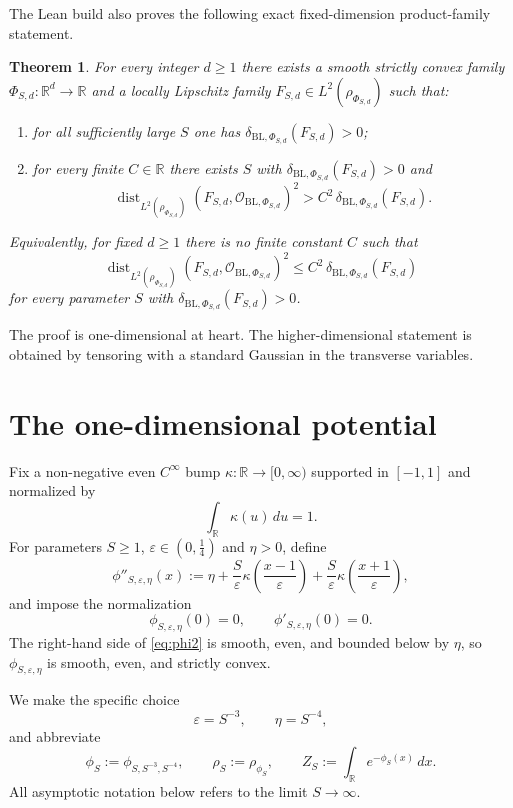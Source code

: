 \documentclass[11pt]{amsart}
\newtheorem{theorem}{Theorem}[section]
\theoremstyle{remark}
\DeclareMathOperator{\dist}{dist}
\newcommand{\R}{\mathbb R}
\newcommand{\cO}{\mathcal O}
\newcommand{\BL}{\mathrm{BL}}
\begin{document}
The Lean build also proves the following exact fixed-dimension product-family
statement.

\begin{theorem}\label{thm:main}
For every integer $d\ge 1$ there exists a smooth strictly convex family
$\Phi_{S,d}:\R^d\to\R$ and a locally Lipschitz family
$F_{S,d}\in L^2(\rho_{\Phi_{S,d}})$ such that:
\begin{enumerate}
\item for all sufficiently large $S$ one has
  $\delta_{\BL,\Phi_{S,d}}(F_{S,d})>0$;
\item for every finite $C\in\R$ there exists $S$ with
  $\delta_{\BL,\Phi_{S,d}}(F_{S,d})>0$ and
  \[
    \dist_{L^2(\rho_{\Phi_{S,d}})}(F_{S,d},\cO_{\BL,\Phi_{S,d}})^2
    > C^2\,\delta_{\BL,\Phi_{S,d}}(F_{S,d}).
  \]
\end{enumerate}
Equivalently, for fixed $d\ge 1$ there is no finite constant $C$ such that
\[
  \dist_{L^2(\rho_{\Phi_{S,d}})}(F_{S,d},\cO_{\BL,\Phi_{S,d}})^2
  \le C^2\,\delta_{\BL,\Phi_{S,d}}(F_{S,d})
\]
for every parameter $S$ with $\delta_{\BL,\Phi_{S,d}}(F_{S,d})>0$.
\end{theorem}

The proof is one-dimensional at heart. The higher-dimensional statement is
obtained by tensoring with a standard Gaussian in the transverse variables.

\section{The one-dimensional potential}

Fix a non-negative even $C^\infty$ bump
$\kappa:\R\to[0,\infty)$ supported in $[-1,1]$ and normalized by
\[
  \int_{\R}\kappa(u)\,du=1.
\]
For parameters $S\ge 1$, $\varepsilon\in(0,\tfrac14)$ and $\eta>0$, define
\begin{equation}\label{eq:phi2}
  \phi''_{S,\varepsilon,\eta}(x)
  :=
  \eta
  +\frac{S}{\varepsilon}\kappa\!\left(\frac{x-1}{\varepsilon}\right)
  +\frac{S}{\varepsilon}\kappa\!\left(\frac{x+1}{\varepsilon}\right),
\end{equation}
and impose the normalization
\[
  \phi_{S,\varepsilon,\eta}(0)=0,
  \qquad
  \phi'_{S,\varepsilon,\eta}(0)=0.
\]
The right-hand side of \eqref{eq:phi2} is smooth, even, and bounded below by
$\eta$, so $\phi_{S,\varepsilon,\eta}$ is smooth, even, and strictly convex.

We make the specific choice
\begin{equation}\label{eq:choice}
  \varepsilon=S^{-3},
  \qquad
  \eta=S^{-4},
\end{equation}
and abbreviate
\[
  \phi_S:=\phi_{S,S^{-3},S^{-4}},
  \qquad
  \rho_S:=\rho_{\phi_S},
  \qquad
  Z_S:=\int_{\R}e^{-\phi_S(x)}\,dx.
\]
All asymptotic notation below refers to the limit $S\to\infty$.
\end{document}

